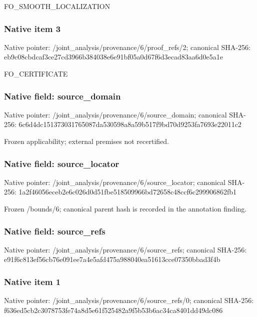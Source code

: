 \documentclass[10pt,a4paper]{article}
\begin{document}
\begingroup\raggedright\sloppy FO\_\allowbreak{}SMOOTH\_\allowbreak{}LOCALIZATION\par\endgroup

\subsubsection{Native item 3}
Native pointer: /joint\_\allowbreak{}analysis/provenance/6/proof\_\allowbreak{}refs/2; canonical SHA-256: eb9c08cbdcaf3ce27cd3966b384038e6e91bf05a0d67f6d3ecad83aa6d0e5a1e

\begingroup\raggedright\sloppy FO\_\allowbreak{}CERTIFICATE\par\endgroup

\subsubsection{Native field: source\_\allowbreak{}domain}
Native pointer: /joint\_\allowbreak{}analysis/provenance/6/source\_\allowbreak{}domain; canonical SHA-256: 6c6d4dc151373031765087da530598a8a59b517f9bd70d9253fa7693e22011c2

\begingroup\raggedright\sloppy Frozen applicability;\allowbreak{} external premises not recertified.\par\endgroup

\subsubsection{Native field: source\_\allowbreak{}locator}
Native pointer: /joint\_\allowbreak{}analysis/provenance/6/source\_\allowbreak{}locator; canonical SHA-256: 1a2f46056eceb2e6c026d0d51fbe518509966bd72658c48ccf6c299906862fb1

\begingroup\raggedright\sloppy Frozen /\allowbreak{}bounds/\allowbreak{}6;\allowbreak{} canonical parent hash is recorded in the annotation finding.\par\endgroup

\subsubsection{Native field: source\_\allowbreak{}refs}
Native pointer: /joint\_\allowbreak{}analysis/provenance/6/source\_\allowbreak{}refs; canonical SHA-256: e91f6c813ef56cb76e091ee7a4e5afd475a988040ea51613cce07350bbad3f4b

\subsubsection{Native item 1}
Native pointer: /joint\_\allowbreak{}analysis/provenance/6/source\_\allowbreak{}refs/0; canonical SHA-256: f636ed5cb2c3078753fe74a8d5e61f525482a9f5b53b6ac34ca8401dd49dc086
\end{document}
